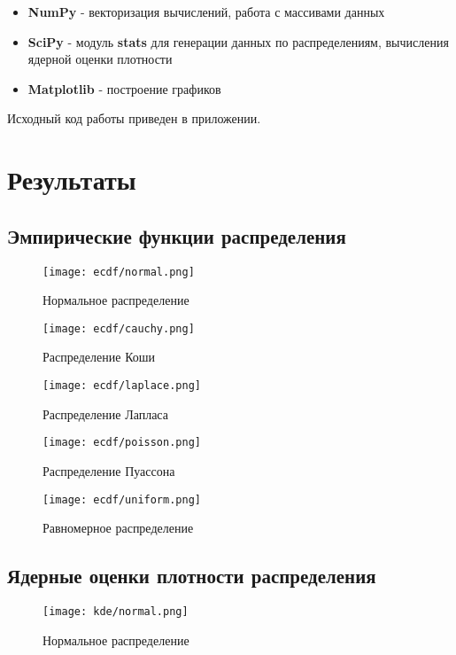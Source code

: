 \documentclass[12pt,a4paper]{article}
\begin{document}
\begin{itemize}
	\item \textbf{NumPy} - векторизация вычислений, работа с массивами данных
	\item \textbf{SciPy} - модуль \textbf{stats} для генерации данных по распределениям, вычисления ядерной оценки плотности
	\item \textbf{Matplotlib} - построение графиков
\end{itemize}

Исходный код работы приведен в приложении. 
\pagebreak

\section{Результаты}
\subsection{Эмпирические функции распределения}
\begin{figure}[h!]
	\centering
	\texttt{[image: ecdf/normal.png]}
	\caption{Нормальное распределение}
	\label{fig:image}
\end{figure}

\begin{figure}[h!]
	\centering
	\texttt{[image: ecdf/cauchy.png]}
	\caption{Распределение Коши}
	\label{fig:image}
\end{figure}
\pagebreak

\begin{figure}[h!]
	\centering
	\texttt{[image: ecdf/laplace.png]}
	\caption{Распределение Лапласа}
	\label{fig:image}
\end{figure}

\begin{figure}[h!]
	\centering
	\texttt{[image: ecdf/poisson.png]}
	\caption{Распределение Пуассона}
	\label{fig:image}
\end{figure}
\pagebreak

\begin{figure}[h!]
	\centering
	\texttt{[image: ecdf/uniform.png]}
	\caption{Равномерное распределение}
	\label{fig:image}
\end{figure}
\pagebreak

\subsection{Ядерные оценки плотности распределения}
\begin{figure}[h!]
	\centering
	\texttt{[image: kde/normal.png]}
	\caption{Нормальное распределение}
	\label{fig:image}
\end{figure}
\pagebreak
\end{document}
